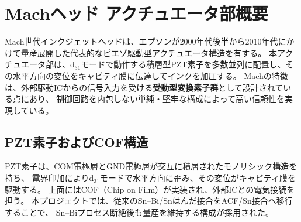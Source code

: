 \documentclass[conference]{IEEEtran}
\begin{document}
\section{Machヘッド アクチュエータ部概要}

Mach世代インクジェットヘッドは、エプソンが2000年代後半から2010年代にかけて量産展開した代表的なピエゾ駆動型アクチュエータ構造を有する。  
本アクチュエータ部は、d$_{31}$モードで動作する積層型PZT素子を多数並列に配置し、その水平方向の変位をキャビティ膜に伝達してインクを加圧する。  
Machの特徴は、外部駆動ICからの信号入力を受ける\textbf{受動型変換素子群}として設計されている点にあり、  
制御回路を内包しない単純・堅牢な構成によって高い信頼性を実現している。

\subsection{PZT素子およびCOF構造}
PZT素子は、COM電極層とGND電極層が交互に積層されたモノリシック構造を持ち、  
電界印加によりd$_{31}$モードで水平方向に歪み、その変位がキャビティ膜を駆動する。  
上面にはCOF（Chip on Film）が実装され、外部ICとの電気接続を担う。  
本プロジェクトでは、従来のSn–Bi/Snはんだ接合をACF/Sn接合へ移行することで、  
Sn–Biプロセス断絶後も量産を維持する構成が採用された。
\end{document}
